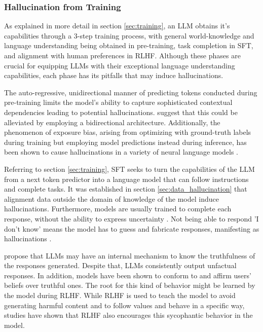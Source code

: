 \documentclass[english, 12pt, a4paper, sci, utf8, a-2b, online]{../definitions/aaltothesis}
\begin{document}
\subsubsection{Hallucination from Training} \label{sec:training_hallucination}

As explained in more detail in section \ref{sec:training}, an LLM obtains it's capabilities through a 3-step training process, with general world-knowledge and language understanding being obtained in pre-training, task completion in SFT, and alignment with human preferences in RLHF. Although these phases are crucial for equipping LLMs with their exceptional language understanding capabilities, each phase has its pitfalls that may induce hallucinations.

The auto-regressive, unidirectional manner of predicting tokens conducted during pre-training limits the model's ability to capture sophisticated contextual dependencies leading to potential hallucinations. \textcite{li2023batgptbidirectionalautoregessivetalker} suggest that this could be alleviated by employing a bidirectional architecture. Additionally, the phenomenon of exposure bias, arising from optimizing with ground-truth labels during training but employing model predictions instead during inference, has been shown to cause hallucinations in a variety of neural language models \cite{wang-sennrich-2020-exposure}.

Referring to section \ref{sec:training}, SFT seeks to turn the capabilities of the LLM from a next token predictor into a language model that can follow instructions and complete tasks. It was established in section \ref{sec:data_hallucination} that alignment data outside the domain of knowledge of the model induce hallucinations. Furthermore, models are usually trained to complete each response, without the ability to express uncertainty \cite{Kalai2025-fl}. Not being able to respond 'I don't know' means the model has to guess and fabricate responses, manifesting as hallucinations \cite{yang2024alignmenthonesty, zhang2024rtuninginstructinglargelanguage}.

\textcite{azaria2023internalstatellmknows} propose that LLMs may have an internal mechanism to know the truthfulness of the responses generated. Despite that, LLMs consistently output unfactual responses. In addition, models have been shown to conform to and affirm users' beliefs over truthful ones. The root for this kind of behavior might be learned by the model during RLHF. While RLHF is used to teach the model to avoid generating harmful content and to follow values and behave in a specific way, studies \cite{sharma2025understandingsycophancylanguagemodels, wei2024simplesyntheticdatareduces} have shown that RLHF also encourages this sycophantic behavior in the model.
\end{document}
